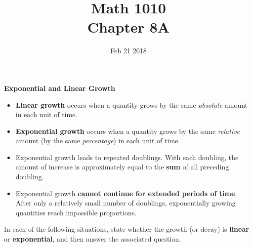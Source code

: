 \documentclass[12pt]{article}
\begin{document}
\title{\bf Math 1010 \\ Chapter 8A\iftoggle{sol}{ Key}{} }
\date{Feb 21 2018}
\maketitle

\renewcommand{\theenumi}{\alph{enumi}}
\renewcommand{\labelenumi}{(\theenumi)}

{\large \bf Exponential and Linear Growth}
\begin{itemize}
	\item {\bf Linear growth} occurs when a quantity grows by the same {\it absolute} amount in each unit of time.
	\item {\bf Exponential growth} occurs when a quantity grows by the same {\it relative} amount (by the same {\it percentage}) in each unit of time.
	\item Exponential growth leads to repeated doublings.  With each doubling, the amount of increase is approximately equal to the {\bf sum} of all preceding doubling.
	\item Exponential growth {\bf cannot continue for extended periods of time}.  After only a relatively small number of doublings, exponentially growing quantities reach impossible proportions.
\end{itemize}


In each of the following situations, state whether the growth (or decay) is {\bf linear} or {\bf exponential}, and then answer the associated question.
\end{document}
